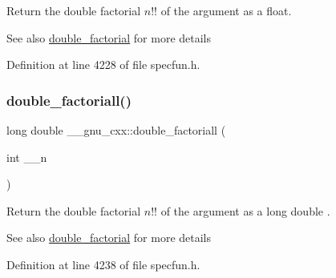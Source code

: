 Return the double factorial $ n!! $ of the argument as a {\ttfamily float}.

\begin{DoxySeeAlso}{See also}
\hyperlink{group__mathsf__gnu_ga1e62c47f84f9782828f8830b4fedc13c}{double\+\_\+factorial} for more details 
\end{DoxySeeAlso}


Definition at line 4228 of file specfun.\+h.

\mbox{\label{group__mathsf__gnu_ga0366730a4a775256217ef1cd9d0c3a04}} 
\subsubsection{\texorpdfstring{double\+\_\+factoriall()}{double\_factoriall()}}
{\footnotesize\ttfamily long double \+\_\+\+\_\+gnu\+\_\+cxx\+::double\+\_\+factoriall (\begin{DoxyParamCaption}\item[{int}]{\+\_\+\+\_\+n }\end{DoxyParamCaption})\hspace{0.3cm}{\ttfamily [inline]}}

Return the double factorial $ n!! $ of the argument as a {\ttfamily  long double }.

\begin{DoxySeeAlso}{See also}
\hyperlink{group__mathsf__gnu_ga1e62c47f84f9782828f8830b4fedc13c}{double\+\_\+factorial} for more details 
\end{DoxySeeAlso}


Definition at line 4238 of file specfun.\+h.

\mbox{\label{group__mathsf__gnu_ga6e44a0d90500e56ef4b3aba6efd7e2b0}} 
